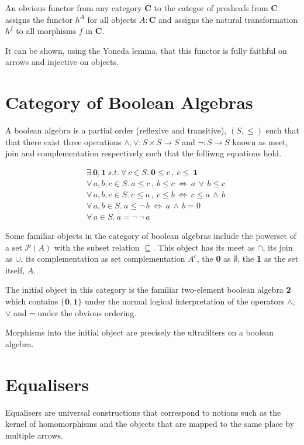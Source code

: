 \documentclass[a4paper,12pt]{article}
\begin{document}
An obvious functor from any category \textbf{C} to the categor of presheafs from
\textbf{C} assigns the functor $h^{A}$ for all objects $A:\textbf{C}$ and
assigns the natural transformation $h^{f}$ to all morphisms $f$ in \textbf{C}.

It can be shown, using the Yoneda lemma, that this functor is fully faithful on
arrows and injective on objects.

\section{Category of Boolean Algebras}
A boolean algebra is a partial order (reflexive and transitive), $(S, \leq)$ such that that
there exist three operations $\land, \lor: S\times S \rightarrow S$  and $\neg:
S \rightarrow S$ known as meet, join and complementation respectively such that
the folliwng equations hold.

\begin{align*}
    &\exists \ \textbf{0}, \textbf{1} \ s.t. \ \forall \ c \in S. \ \textbf{0}
    \leq c \, , \ c \leq \ \textbf{1} \\
    &\forall \, a, b, c \in S. \ a \leq c \, , \ b \leq c \ \Leftrightarrow \ a \,
    \lor \, b \leq c \\
    &\forall \, a, b, c  \in S. \ c \leq a \, , \ c \leq b \ \Leftrightarrow \ c
    \leq a \, \land \, b \\
    &\forall \, a, b \in S. \ a \leq \neg \, b \ \Leftrightarrow \ a \, \land \,
    b = 0 \\
    &\forall \, a \in S. \   a = \neg \, \neg \, a
\end{align*}

Some familiar objects in the category of boolean algebras include the powerset
of a set $\mathcal{P}(A)$ with the subset relation $\subseteq$. This object has
its meet as $\cap$, its join as $\cup$, its complementation as set
complementation $A^c$, the \textbf{0} as $\emptyset$, the \textbf{1} as the set
itself, $A$.

The initial object in this category is the familiar two-element boolean algebra
\textbf{2} which contains $ \{\textbf{0}, \textbf{1}\}$ under the normal logical
interpretation of the operators $\land$, $\lor$ and $\neg$ under the obvious
ordering.

Morphisms into the initial object are precisely the ultrafilters on a boolean
algebra.
\section{Equalisers}
Equalisers are universal constructions that correspond to notions such as the
kernel of homomorphisms and the objects that are mapped to the same place by
multiple arrows.
\end{document}

